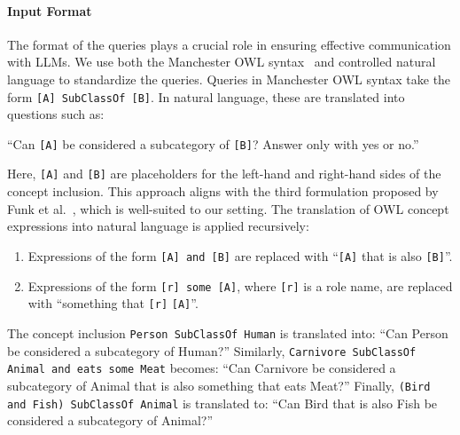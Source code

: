 \paragraph{Input Format}
\label{par:input-format}
%
The format of the queries plays a crucial role in ensuring effective communication with \glspl{LLM}.
%
We use both the Manchester \gls{OWL} syntax~\cite{DBLP:conf/owled/HorridgeDGRSW06} and controlled natural language to standardize the queries.
%
Queries in Manchester \gls{OWL} syntax take the form \texttt{[A] SubClassOf [B]}.
%
In natural language, these are translated into questions such as:
%
\begin{center}
    ``Can \texttt{[A]} be considered a subcategory of \texttt{[B]}? Answer only with yes or no.''
\end{center}
%
Here, \texttt{[A]} and \texttt{[B]} are placeholders for the left-hand and right-hand sides of the concept inclusion.
%
This approach aligns with the third formulation proposed by Funk et al.~\cite{DBLP:conf/kbclm/2023}, which is well-suited to our setting.
%
The translation of \gls{OWL} concept expressions into natural language is applied recursively:
%
\begin{enumerate}
    \item Expressions of the form \texttt{[A] and [B]} are replaced with ``\texttt{[A]} that is also \texttt{[B]}''.
    \item Expressions of the form \texttt{[r] some [A]}, where \texttt{[r]} is a role name, are replaced with ``something that \texttt{[r]} \texttt{[A]}''.
\end{enumerate}
%
\begin{example}\upshape
    The concept inclusion \texttt{Person SubClassOf Human} is translated into:
    ``Can Person be considered a subcategory of Human?''
    Similarly, \texttt{Carnivore SubClassOf Animal and eats some Meat} becomes:
    ``Can Carnivore be considered a subcategory of Animal that is also something that eats Meat?''
    Finally, \texttt{(Bird and Fish) SubClassOf Animal} is translated to:
    ``Can Bird that is also Fish be considered a subcategory of Animal?''
\end{example}


